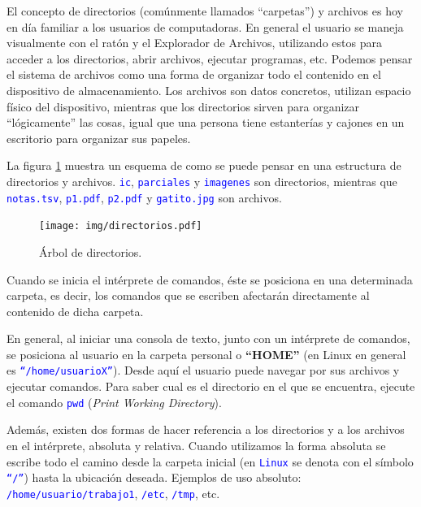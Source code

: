 \documentclass[12pt]{article}
\newcommand{\cw}[1]{\texttt{\textcolor{blue}{#1}}}
\begin{document}
\label{sec:sistemaDeArchivos}

El concepto de directorios (comúnmente llamados ``carpetas'') y archivos es
hoy en día familiar a los usuarios de computadoras. En general el usuario se
maneja visualmente con el ratón y el Explorador de Archivos, utilizando estos
para acceder a los directorios, abrir archivos, ejecutar programas, etc.
Podemos pensar el sistema de archivos como una forma de organizar todo el
contenido en el dispositivo de almacenamiento. Los archivos son datos
concretos, utilizan espacio físico del dispositivo, mientras que los
directorios sirven para organizar ``lógicamente'' las cosas, igual que una
persona tiene estanterías y cajones en un escritorio para organizar sus
papeles.

La figura \ref{arbolDirectorios}  muestra un esquema de como se puede pensar en
una estructura de directorios y archivos. \cw{ic}, \cw{parciales} y
\cw{imagenes} son directorios, mientras que \cw{notas.tsv}, \cw{p1.pdf},
\cw{p2.pdf} y \cw{gatito.jpg} son archivos.

\begin{figure}[!htb]

    \centering

    \texttt{[image: img/directorios.pdf]}

    \caption{Árbol de directorios.}

    \label{arbolDirectorios}

\end{figure}

Cuando se inicia el intérprete de comandos, éste se posiciona en una
determinada carpeta, es decir, los comandos que se escriben afectarán
directamente al contenido de dicha carpeta.

En general, al iniciar una consola de texto, junto con un intérprete de
comandos, se posiciona al usuario en la carpeta personal o \textbf{``HOME''}
(en Linux en general es \cw{``/home/usuarioX''}). Desde aquí el usuario
puede navegar por sus archivos y ejecutar comandos. Para saber cual es el
directorio en el que se encuentra, ejecute el comando \cw{pwd} (\emph{Print
Working Directory}).

Además, existen dos formas de hacer referencia a los directorios y a los
archivos en el intérprete, absoluta y relativa. Cuando utilizamos la forma
absoluta se escribe todo el camino desde la carpeta inicial (en \cw{Linux}
se denota con el símbolo \cw{``/''}) hasta la ubicación deseada. Ejemplos de
uso absoluto: \cw{/home/usuario/trabajo1}, \cw{/etc}, \cw{/tmp}, etc.
\end{document}
